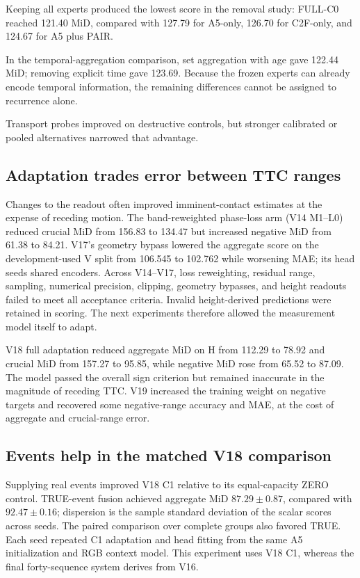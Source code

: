 Keeping all experts produced the lowest score in the removal study: FULL-C0 reached 121.40 MiD, compared with 127.79 for A5-only, 126.70 for C2F-only, and 124.67 for A5 plus PAIR.

In the temporal-aggregation comparison, set aggregation with age gave 122.44 MiD; removing explicit time gave 123.69. Because the frozen experts can already encode temporal information, the remaining differences cannot be assigned to recurrence alone.

Transport probes improved on destructive controls, but stronger calibrated or pooled alternatives narrowed that advantage. 

\subsection{Adaptation trades error between TTC ranges}
Changes to the readout often improved imminent-contact estimates at the expense of receding motion. The band-reweighted phase-loss arm (V14 M1--L0) reduced crucial MiD from 156.83 to 134.47 but increased negative MiD from 61.38 to 84.21. V17's geometry bypass lowered the aggregate score on the development-used V split from 106.545 to 102.762 while worsening MAE; its head seeds shared encoders. Across V14--V17, loss reweighting, residual range, sampling, numerical precision, clipping, geometry bypasses, and height readouts failed to meet all acceptance criteria. Invalid height-derived predictions were retained in scoring. The next experiments therefore allowed the measurement model itself to adapt. 

V18 full adaptation reduced aggregate MiD on H from 112.29 to 78.92 and crucial MiD from 157.27 to 95.85, while negative MiD rose from 65.52 to 87.09. The model passed the overall sign criterion but remained inaccurate in the magnitude of receding TTC. V19 increased the training weight on negative targets and recovered some negative-range accuracy and MAE, at the cost of aggregate and crucial-range error. 

\subsection{Events help in the matched V18 comparison}
Supplying real events improved V18 C1 relative to its equal-capacity ZERO control. TRUE-event fusion achieved aggregate MiD $87.29\pm0.87$, compared with $92.47\pm0.16$; dispersion is the sample standard deviation of the scalar scores across seeds. The paired comparison over complete groups also favored TRUE. Each seed repeated C1 adaptation and head fitting from the same A5 initialization and RGB context model. This experiment uses V18 C1, whereas the final forty-sequence system derives from V16. 


